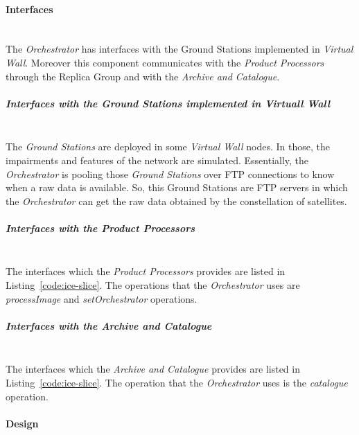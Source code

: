 \paragraph{Interfaces}~\\

The \emph{Orchestrator} has interfaces with the Ground Stations implemented in
\emph{Virtual Wall}. Moreover this component  communicates with the \emph{Product Processors} through the Replica
Group and with the
\emph{Archive and Catalogue}. 

\subparagraph{Interfaces with the Ground Stations implemented in Virtuall
  Wall}~\\


The \emph{Ground Stations} are deployed in some \emph{Virtual Wall} nodes. In
those, the impairments and features of the network are simulated. Essentially,
the \emph{Orchestrator} is pooling those \emph{Ground Stations} over \ac{FTP}
connections to know when a raw data is available. So, this Ground Stations are
\ac{FTP} servers in which the \emph{Orchestrator} can get the raw data obtained
by the constellation of satellites.

\subparagraph{Interfaces with the Product Processors}~\\

The interfaces which the \emph{Product Processors} provides are listed in
Listing~\ref{code:ice-slice}. The operations that the \emph{Orchestrator} uses
are \emph{processImage} and \emph{setOrchestrator} operations.

\subparagraph{Interfaces with the Archive and Catalogue}~\\

The interfaces which the \emph{Archive and Catalogue} provides are listed in
Listing~\ref{code:ice-slice}. The operation that the \emph{Orchestrator} uses is
the \emph{catalogue} operation.


\paragraph{Design}~\\

